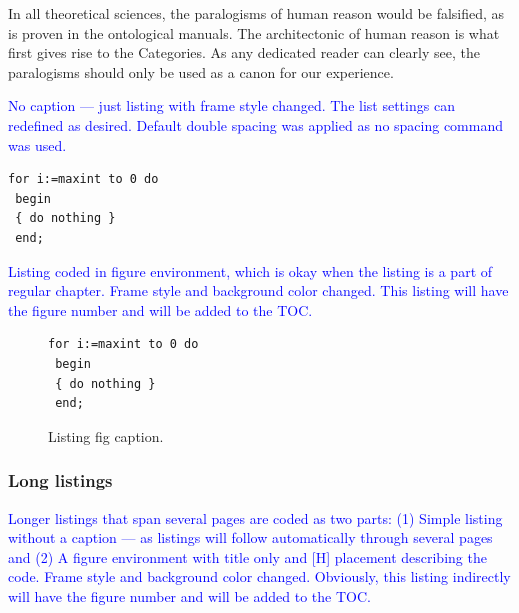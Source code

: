 \documentclass[phd]{ndsu-thesis-2022}
\newcommand\italk[1]{\textcolor{blue}{#1}}  %
\begin{document}
In all theoretical sciences, the paralogisms of human reason would be falsified, as is proven in the ontological manuals. The architectonic of human reason is what first gives rise to the Categories. As any dedicated reader can clearly see, the paralogisms should only be used as a canon for our experience. 

\italk{No caption --- just listing with frame style changed. The list settings can redefined as desired. Default double spacing was applied as no spacing command was used.}
\vspace{3mm}

\lstset{frameround=fttt}
\begin{lstlisting}[frame=trBL, caption={}]
 for i:=maxint to 0 do
 begin
 { do nothing }
 end;
\end{lstlisting}

\kant[9]
\italk{Listing coded in figure environment, which is okay when the listing is a part of regular chapter. Frame style and background color changed. This listing will have the figure number and will be added to the TOC.}

\begin{figure}[ht!]
{\singlespacing
\lstset{frameround=fttt}
\begin{lstlisting}[frame=trBL, backgroundcolor=\color{blue!10!white}]
 for i:=maxint to 0 do
 begin
 { do nothing }
 end;
\end{lstlisting}
}
\caption{Listing fig caption.}
\end{figure}

\subsubsection{Long listings}

\italk{Longer listings that span several pages are coded as two parts: (1) Simple listing without a caption --- as listings will follow automatically through several pages and (2) A figure environment with title only and [H] placement describing the code. Frame style and background color changed. Obviously, this listing indirectly will have the figure number and will be added to the TOC.}
\end{document}

